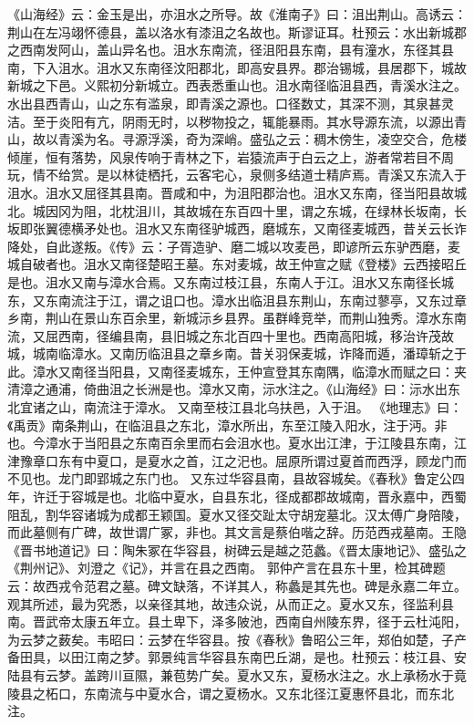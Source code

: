 \documentclass[12pt,UTF8]{ctexbook}
\begin{document}
《山海经》云：金玉是出，亦沮水之所导。故《淮南子》曰：沮出荆山。高诱云：荆山在左冯翊怀德县，盖以洛水有漆沮之名故也。斯谬证耳。杜预云：水出新城郡之西南发阿山，盖山异名也。沮水东南流，径沮阳县东南，县有潼水，东径其县南，下入沮水。沮水又东南径汶阳郡北，即高安县界。郡治锡城，县居郡下，城故新城之下邑。义熙初分新城立。西表悉重山也。沮水南径临沮县西，青溪水注之。水出县西青山，山之东有滥泉，即青溪之源也。口径数丈，其深不测，其泉甚灵洁。至于炎阳有亢，阴雨无时，以秽物投之，辄能暴雨。其水导源东流，以源出青山，故以青溪为名。寻源浮溪，奇为深峭。盛弘之云：稠木傍生，凌空交合，危楼倾崖，恒有落势，风泉传响于青林之下，岩猿流声于白云之上，游者常若目不周玩，情不给赏。是以林徒栖托，云客宅心，泉侧多结道士精庐焉。青溪又东流入于沮水。沮水又屈径其县南。晋咸和中，为沮阳郡治也。沮水又东南，径当阳县故城北。城因冈为阻，北枕沮川，其故城在东百四十里，谓之东城，在绿林长坂南，长坂即张翼德横矛处也。沮水又东南径驴城西，磨城东，又南径麦城西，昔关云长诈降处，自此遂叛。《传》云：子胥造驴、磨二城以攻麦邑，即谚所云东驴西磨，麦城自破者也。沮水又南径楚昭王墓。东对麦城，故王仲宣之赋《登楼》云西接昭丘是也。沮水又南与漳水合焉。又东南过枝江县，东南人于江。沮水又东南径长城东，又东南流注于江，谓之诅口也。漳水出临沮县东荆山，东南过蓼亭，又东过章乡南，荆山在景山东百余里，新城沶乡县界。虽群峰竞举，而荆山独秀。漳水东南流，又屈西南，径编县南，县旧城之东北百四十里也。西南高阳城，移治许茂故城，城南临漳水。又南历临沮县之章乡南。昔关羽保麦城，诈降而遁，潘璋斩之于此。漳水又南径当阳县，又南径麦城东，王仲宣登其东南隅，临漳水而赋之曰：夹清漳之通浦，倚曲沮之长洲是也。漳水又南，沶水注之。《山海经》曰：沶水出东北宜诸之山，南流注于漳水。
又南至枝江县北乌扶邑，入于沮。
《地理志》曰：《禹贡》南条荆山，在临沮县之东北，漳水所出，东至江陵入阳水，注于沔。非也。今漳水于当阳县之东南百余里而右会沮水也。夏水出江津，于江陵县东南，江津豫章口东有中夏口，是夏水之首，江之汜也。屈原所谓过夏首而西浮，顾龙门而不见也。龙门即郢城之东门也。
又东过华容县南，县故容城矣。《春秋》鲁定公四年，许迁于容城是也。北临中夏水，自县东北，径成都郡故城南，晋永嘉中，西蜀阻乱，割华容诸城为成都王颖国。夏水又径交趾太守胡宠墓北。汉太傅广身陪陵，而此墓侧有广碑，故世谓广冢，非也。其文言是蔡伯喈之辞。历范西戎墓南。王隐《晋书地道记》曰：陶朱冢在华容县，树碑云是越之范蠡。《晋太康地记》、盛弘之《荆州记》、刘澄之《记》，并言在县之西南。
郭仲产言在县东十里，检其碑题云：故西戎令范君之墓。碑文缺落，不详其人，称蠡是其先也。碑是永嘉二年立。观其所述，最为究悉，以亲径其地，故违众说，从而正之。夏水又东，径监利县南。晋武帝太康五年立。县土卑下，泽多陂池，西南自州陵东界，径于云杜沌阳，为云梦之薮矣。韦昭曰：云梦在华容县。按《春秋》鲁昭公三年，郑伯如楚，子产备田具，以田江南之梦。郭景纯言华容县东南巴丘湖，是也。杜预云：枝江县、安陆县有云梦。盖跨川亘隰，兼苞势广矣。夏水又东，夏杨水注之。水上承杨水于竟陵县之柘口，东南流与中夏水合，谓之夏杨水。又东北径江夏惠怀县北，而东北注。
\end{document}
